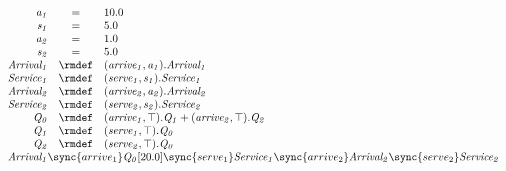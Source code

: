 \begin{displaymath}
	\begin{array}{rcl}
		\mathit{a_1} & = & 10.0\\
		\mathit{s_1} & = & 5.0\\
		\mathit{a_2} & = & 1.0\\
		\mathit{s_2} & = & 5.0\\
[0.0ex]		\mathit{Arrival_1} & \rmdef & (\mathit{arrive_1},\mathit{a_1}).\mathit{Arrival_1}\\
		\mathit{Service_1} & \rmdef & (\mathit{serve_1},\mathit{s_1}).\mathit{Service_1}\\
		\mathit{Arrival_2} & \rmdef & (\mathit{arrive_2},\mathit{a_2}).\mathit{Arrival_2}\\
		\mathit{Service_2} & \rmdef & (\mathit{serve_2},\mathit{s_2}).\mathit{Service_2}\\
		\mathit{Q_0} & \rmdef & (\mathit{arrive_1},\top).\mathit{Q_1}+(\mathit{arrive_2},\top).\mathit{Q_2}\\
		\mathit{Q_1} & \rmdef & (\mathit{serve_1},\top).\mathit{Q_0}\\
		\mathit{Q_2} & \rmdef & (\mathit{serve_2},\top).\mathit{Q_0}\\
[0.0ex]		\multicolumn{3}{l}{\mathit{Arrival_1}\sync{arrive_1}\mathit{Q_0}[20.0]\sync{serve_1}\mathit{Service_1}\sync{arrive_2}\mathit{Arrival_2}\sync{serve_2}\mathit{Service_2}}\\
[0.0ex]	\end{array}
\end{displaymath}
